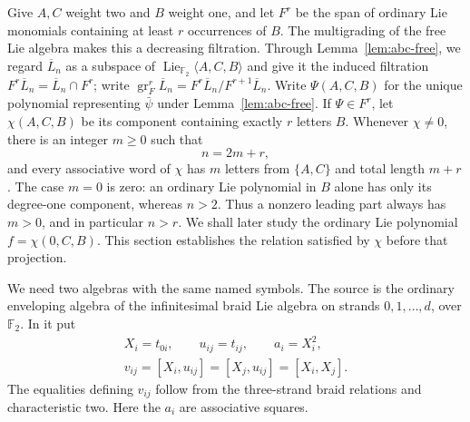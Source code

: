 \documentclass[11pt]{article}
\theoremstyle{definition}
\theoremstyle{remark}
\numberwithin{equation}{section}
\begin{document}
Give $A,C$ weight two and $B$ weight one, and let $F^r$ be the span of
ordinary Lie monomials containing at least $r$ occurrences of $B$.
The multigrading of the free Lie algebra makes this a decreasing
filtration.  Through Lemma~\ref{lem:abc-free}, we regard
$\overline L_n$ as a subspace of
$\operatorname{Lie}_{{\mathbb F_2}}\langle A,C,B\rangle$ and give it the induced filtration
$F^r\overline L_n=\overline L_n\cap F^r$; write
$\operatorname{gr}^r_F\overline L_n=
F^r\overline L_n/F^{r+1}\overline L_n$.
Write $\Psi(A,C,B)$ for the unique polynomial representing
$\bar\psi$ under Lemma~\ref{lem:abc-free}.  If $\Psi\in F^r$, let
$\chi(A,C,B)$ be its component containing exactly $r$ letters $B$.
Whenever $\chi\ne0$, there is an integer $m\geq0$ such that
\begin{equation}\label{eq:leading-count-weight}
 n=2m+r,
\end{equation}
and every associative word of $\chi$ has $m$ letters from $\{A,C\}$
and total length $m+r$.  The case $m=0$ is zero: an ordinary Lie
polynomial in $B$ alone has only its degree-one component, whereas
$n>2$.  Thus a nonzero leading part always has $m>0$, and in particular
$n>r$.  We shall later study the ordinary Lie polynomial
$f=\chi(0,C,B)$.  This section establishes the relation satisfied by
$\chi$ before that projection.

We need two algebras with the same named symbols.  The source is the
ordinary enveloping algebra of the infinitesimal braid Lie algebra
on strands $0,1,\ldots,d$, over ${\mathbb F_2}$.  In it put
\begin{equation}\label{eq:source-symbols}
\begin{gathered}
 X_i=t_{0i},\qquad u_{ij}=t_{ij},\qquad
 a_i=X_i^2,\\
 v_{ij}=[X_i,u_{ij}]=[X_j,u_{ij}]=[X_i,X_j].
\end{gathered}
\end{equation}
The equalities defining $v_{ij}$ follow from the three-strand braid
relations and characteristic two.  Here the $a_i$ are associative
squares.
\end{document}
